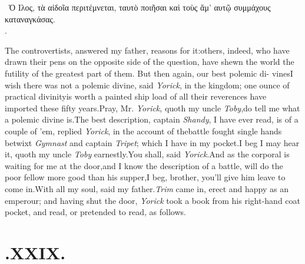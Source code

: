 \documentclass{article}
\begin{document}
\vfill
\bgroup\footnotesize
\indent\fnast\ Ὁ Ιλος, τὰ αἰδοῖα περιτέμνεται, ταυτὸ
ποιῆ\-σαι καὶ τοὺς ἅμ’ αυτῷ συμμάχους καταναγκάσας.\\
\null\hfill{}.\par
\egroup
{}
\eject

The controvertists, answered my father,  reasons for it:\tsk others, indeed, who have drawn
their pens on the opposite side of the question, have shewn the
world the futility of the greatest part of them.\tsk\break
But then again, our best polemic di-\break 
vines\tsk I wish there was not a
polemic divine, said \textit{Yorick}, in the kingdom;\tsk\break
one ounce of practical divinity\tsk is worth a painted ship load of all
their reverences have imported these fifty years.\tsk Pray, Mr.
\textit{Yorick}, quoth my uncle \textit{Toby},\tsk do tell me what a
polemic divine is.\tsh\break The best description, captain
\textit{Shandy}, I have ever read, is of a couple of ’em,
replied \textit{Yorick}, in the account of the\break battle fought single
hands betwixt \textit{Gym\-nast} and captain \textit{Tripet}; which I
have in my pocket.\tsh I beg I may hear it, quoth my uncle
\textit{Toby} earnestly.\tsk You shall, said \textit{Yorick}.\tsk And as the corporal
is waiting for me at the door,\tsk and I 
know the description of a battle, will\break
do the poor fellow more good than his\break
supper,\tsk I beg, brother, you’ll give him\break
leave to come in.\tsk With all my soul,\break
said my father.\tsh \textit{Trim} came in, erect\break
and happy as an emperour; and having\break
shut the door, \textit{Yorick} took a book from\break
his right-hand coat pocket, and read, or\break
pretended to read, as follows.


\section{.\enspace  XXIX.}
\end{document}
